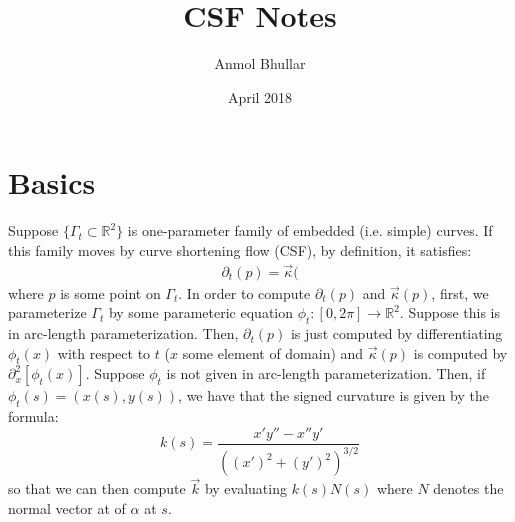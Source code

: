 \documentclass{article}
\title{CSF Notes}
\author{Anmol Bhullar}
\date{April 2018}
\begin{document}
\maketitle

\section{Basics}

Suppose $\{\Gamma_t\subset\mathbb{R}^2\}$ is one-parameter family of embedded (i.e. simple) curves. If
this family moves by curve shortening flow (CSF), by definition, it satisfies:
\begin{align} \tag{1.1}
    \partial_t (p) = \vec{\kappa}(%
\end{align}
where $p$ is some point on $\Gamma_t$. In order to compute $\partial_t(p)$ and $\vec{\kappa}(p)$, first, we
parameterize $\Gamma_t$ by some parameteric equation $\phi_t:[0,2\pi]\to\mathbb{R}^2$. Suppose this is in
arc-length parameterization. Then, $\partial_t(p)$ is just computed by differentiating $\phi_t(x)$
with respect to $t$ ($x$ some element of domain) and $\vec{\kappa}(p)$ is computed by $\partial_x^2[\phi_t(x)]$.
Suppose $\phi_t$ is not given in arc-length parameterization. Then, if $\phi_t(s) = (x(s),y(s))$, we have that the
signed curvature is given by the formula:
\[ k(s) = \frac{x'y''-x''y'}{((x')^2+(y')^2)^{3/2}}\]
so that we can then compute $\vec{k}$ by evaluating $k(s)N(s)$ where $N$ denotes the normal vector at of $\alpha$ at
$s$.
\end{document}
